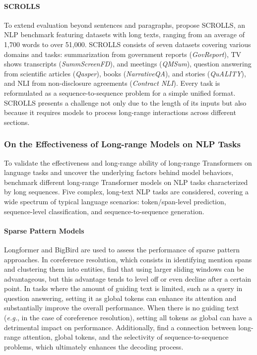 \paragraph{SCROLLS} To extend evaluation beyond sentences and paragraphs, \citet{shaham2022scrolls} propose \ac{SCROLLS}, an \ac{NLP} benchmark featuring datasets with long texts, ranging from an average of 1,700 words to over 51,000. \ac{SCROLLS} consists of seven datasets covering various domains and tasks: summarization from government reports (\textit{GovReport}), TV shows transcripts (\textit{SummScreenFD}), and meetings (\textit{QMSum}), question answering from scientific articles (\textit{Qasper}), books (\textit{NarrativeQA}), and stories (\textit{QuALITY}), and \ac{NLI} from non-disclosure agreements (\textit{Contract NLI}). Every task is reformulated as a sequence-to-sequence problem for a simple unified format. \ac{SCROLLS} presents a challenge not only due to the length of its inputs but also because it requires models to process long-range interactions across different sections. 

\subsubsection{On the Effectiveness of Long-range Models on NLP Tasks}

To validate the effectiveness and long-range ability of long-range Transformers on language tasks and uncover the underlying factors behind model behaviors, \citet{qin2022nlp} benchmark different long-range Transformer models on \ac{NLP} tasks characterized by long sequences. Five complex, long-text \ac{NLP} tasks are considered, covering a wide spectrum of typical language scenarios: token/span-level prediction, sequence-level classification, and sequence-to-sequence generation.

\paragraph{Sparse Pattern Models}

Longformer and BigBird are used to assess the performance of sparse pattern approaches. In coreference resolution, which consists in identifying mention spans and clustering them into entities, \citet{qin2022nlp} find that using larger sliding windows can be advantageous, but this advantage tends to level off or even decline after a certain point. In tasks where the amount of guiding text is limited, such as a query in question answering, setting it as global tokens can enhance its attention and substantially improve the overall performance. When there is no guiding text (\textit{e.g.}, in the case of coreference resolution), setting all tokens as global can have a detrimental impact on performance. Additionally, \citet{qin2022nlp} find a connection between long-range attention, global tokens, and the selectivity of sequence-to-sequence problems, which ultimately enhances the decoding process.

